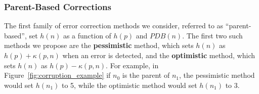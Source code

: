 \documentclass[letterpaper]{article}
\begin{document}





\subsubsection{Parent-Based Corrections}
The first family of error correction methods we consider, referred to as ``parent-based'', set $h(n)$ as a function of $h(p)$ and $PDB(n)$. 
The first two such methods we propose are the \textbf{pessimistic} method, which sets $h(n)$ as $h(p) + \kappa(p, n)$ when an error is detected, and the \textbf{optimistic} method, which sets $h(n)$ as $h(p) - \kappa(p, n)$. For example, in Figure~\ref{fig:corruption_example} if $n_0$ is the parent of $n_1$, the pessimistic method would set $h(n_1)$ to 5, while the optimistic method would set $h(n_1)$ to 3.

%
%
\end{document}
